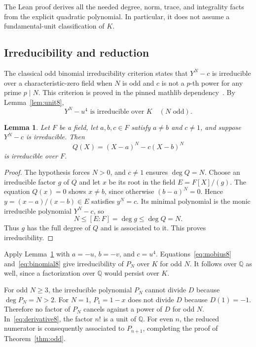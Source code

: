\documentclass[11pt]{article}
\newtheorem{lemma}[theorem]{Lemma}
\newcommand{\Q}{\mathbb Q}
\begin{document}
The Lean proof derives all the needed degree, norm, trace, and
integrality facts from the explicit quadratic polynomial. In particular,
it does not assume a fundamental-unit classification of $K$.

\subsection{Irreducibility and reduction}

The classical odd binomial irreducibility criterion states that
$Y^N-c$ is irreducible over a characteristic-zero field when $N$ is odd
and $c$ is not a $p$-th power for any prime $p\mid N$. This criterion
is proved in the pinned mathlib dependency~\cite{mathlib}. By
Lemma~\ref{lem:unit8},
\begin{equation}\label{eq:binomial8}
Y^N-u^4\text{ is irreducible over }K\quad(N\text{ odd}).
\end{equation}

\begin{lemma}\label{lem:mobius8}
Let $F$ be a field, let $a,b,c\in F$ satisfy $a\ne b$ and $c\ne1$,
and suppose $Y^N-c$ is irreducible. Then
\[
Q(X)=(X-a)^N-c(X-b)^N
\]
is irreducible over $F$.
\end{lemma}
\begin{proof}
The hypothesis forces $N>0$, and $c\ne1$ ensures $\deg Q=N$.
Choose an irreducible factor $g$ of $Q$ and let $x$ be its root in the
field $E=F[X]/(g)$. The equation $Q(x)=0$ shows $x\ne b$, since
otherwise $(b-a)^N=0$. Hence $y=(x-a)/(x-b)\in E$ satisfies $y^N=c$.
Its minimal polynomial is the monic irreducible polynomial $Y^N-c$,
so
\[
N\leq[E:F]=\deg g\leq\deg Q=N.
\]
Thus $g$ has the full degree of $Q$ and is associated to it. This proves
irreducibility.
\end{proof}

Apply Lemma~\ref{lem:mobius8} with $a=-u$, $b=-v$, and $c=u^4$.
Equations~\eqref{eq:mobius8} and~\eqref{eq:binomial8} give
irreducibility of $P_N$ over $K$ for odd $N$. It follows over $\Q$
as well, since a factorization over $\Q$ would persist over $K$.

For odd $N\geq3$, the irreducible polynomial $P_N$ cannot divide $D$
because $\deg P_N=N>2$. For $N=1$, $P_1=1-x$ does not divide $D$
because $D(1)=-1$. Therefore no factor of $P_N$ cancels against a power
of $D$ for odd $N$. In~\eqref{eq:derivative8}, the factor $n!$ is a
unit of $\Q$. For even $n$, the reduced numerator is consequently
associated to $P_{n+1}$, completing the proof of Theorem~\ref{thm:odd}.
\end{document}
